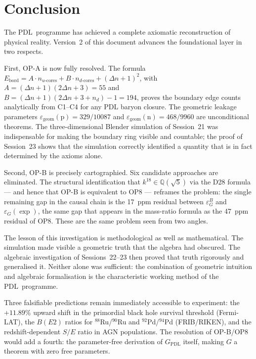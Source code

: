 \documentclass[12pt,a4paper]{article}
\theoremstyle{plain}
\theoremstyle{definition}
\theoremstyle{remark}
\newcommand{\PDL}{\textsc{PDL}}
\newcommand{\Deltanop}{\Delta n}
\newcommand{\egeom}{\varepsilon_{\mathrm{geom}}}
\newcommand{\eG}{\varepsilon_G}
\newcommand{\eGB}{\varepsilon_G^B}
\begin{document}
\section{Conclusion}
\label{sec:conclusion}

The \PDL\ programme has achieved a complete axiomatic reconstruction of physical reality. Version~2 of this document advances the foundational layer in two respects.

First, OP-A is now fully resolved. The formula $E_{\mathrm{bord}} = A\cdot n_{u\text{-cores}} + B\cdot n_{d\text{-cores}} + (\Deltanop+1)^2$, with $A=(\Deltanop+1)(2\Deltanop+3)=55$ and $B=(\Deltanop+1)(2\Deltanop+3+n_d)-1=194$, proves the boundary edge counts analytically from C1--C4 for any PDL baryon closure. The geometric leakage parameters $\egeom(\mathrm{p})=329/10087$ and $\egeom(\mathrm{n})=468/9960$ are unconditional theorems. The three-dimensional Blender simulation of Session~21 was indispensable for making the boundary ring visible and countable; the proof of Session~23 shows that the simulation correctly identified a quantity that is in fact determined by the axioms alone.

Second, OP-B is precisely cartographied. Six candidate approaches are eliminated. The structural identification that $k^{18}\in\mathbb{Q}(\sqrt{5})$ via the D28 formula --- and hence that OP-B is equivalent to OP8 --- reframes the problem: the single remaining gap in the causal chain is the 17~ppm residual between $\eGB$ and $\eG(\exp)$, the same gap that appears in the mass-ratio formula as the 47~ppm residual of OP8. These are the same problem seen from two angles.

The lesson of this investigation is methodological as well as mathematical. The simulation made visible a geometric truth that the algebra had obscured. The algebraic investigation of Sessions~22--23 then proved that truth rigorously and generalised it. Neither alone was sufficient: the combination of geometric intuition and algebraic formalisation is the characteristic working method of the \PDL\ programme.

Three falsifiable predictions remain immediately accessible to experiment: the $+11.89\%$ upward shift in the primordial black hole survival threshold (Fermi-LAT), the $B(E2)$ ratios for $^{88}$Ru/$^{90}$Ru and $^{92}$Pd/$^{94}$Pd (FRIB/RIKEN), and the redshift-dependent $S/E$ ratio in AGN populations. The resolution of OP-B/OP8 would add a fourth: the parameter-free derivation of $G_{\mathrm{PDL}}$ itself, making $G$ a theorem with zero free parameters.



\end{document}
